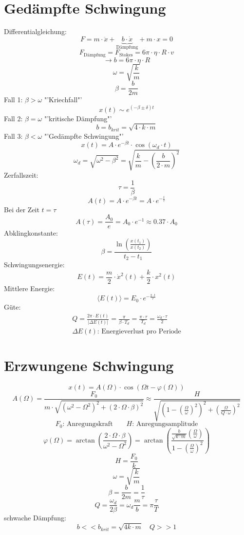 \section{Gedämpfte Schwingung}
Differentialgleichung: 
\[ \boxed{F = m \cdot \ddot{x} + \underbrace{b \cdot \dot{x}}_
{\text{Dämpfung}} + m \cdot x = 0} \]
\[ \boxed{F_{\text{Dämpfung}} = F_{\text{Stokes}} 
= 6 \pi \cdot \eta \cdot R \cdot v} \]
\[ \boxed{\rightarrow b = 6 \pi \cdot \eta \cdot R} \]
\[ \boxed{\omega = \sqrt{\frac{k}{m}}} \]
\[ \boxed{\beta = \frac{b}{2 m}} \]
Fall 1: $\beta > \omega$ "'Kriechfall"'
\[ \boxed{x(t) \sim e^{(-\beta \pm \delta)t}} \]
Fall 2: $\beta = \omega$ "'kritische Dämpfung"'
\[ \boxed{b = b_{krit} = \sqrt{4 \cdot k \cdot m}} \]
Fall 3: $\beta < \omega$ "'Gedämpfte Schwingung"'
\[ \boxed{x(t) = A \cdot e^{-\beta t} \cdot \cos(\omega_d \cdot t)} \]
\[ \boxed{\omega_d = \sqrt{\omega^2 - \beta^2} 
= \sqrt{\frac{k}{m} - \left({\frac{b}{2 \cdot m}}\right)^2}} \]
Zerfallszeit: 
\[ \boxed{\tau = \frac{1}{\beta}} \]
\[ \boxed{A(t) = A \cdot e^{-\beta t} = A \cdot e^{-\frac{t}{\tau}}} \]
Bei der Zeit $t = \tau$
\[ \boxed{A(\tau) = \frac{A_0}{e} = A_0 \cdot e^{-1} \approx 0.37 \cdot A_0} \]
Abklingkonstante: 
\[ \boxed{\beta 
= \frac{\ln\left(\frac{x(t_1)}{x(t_2)}\right)}{t_2 - t_1}} \]
Schwingungsenergie: 
\[ \boxed{E(t) = \frac{m}{2} \cdot \dot{x}^2(t) + \frac{k}{2} \cdot x^2(t)} \]
Mittlere Energie: 
\[ \boxed{\langle E(t)\rangle = E_0 \cdot e^{-\frac{2 \cdot t}{\tau}}} \]
Güte: 
\[ \begin{array}{l}
\boxed{Q = \frac{2 \pi \cdot E(t)}{|\Delta E(t)|} 
= \frac{\pi}{\beta \cdot T_d} = \frac{\pi \cdot \tau}{T_d} 
= \frac{\omega_d \cdot \tau}{2}} \\
\text{$\Delta E(t)$: Energieverlust pro Periode}
\end{array} \]

\section{Erzwungene Schwingung}
\[ \boxed{x(t) = A(\Omega) \cdot \cos(\Omega t - \varphi(\Omega))} \]
\[ \boxed{A(\Omega) = \frac{F_0}{m \cdot 
\sqrt{(\omega^2 - \Omega^2)^2 + (2 \cdot \Omega \cdot \beta)^2}} 
\approx \frac{H}{\sqrt{\left(1 - \left(\frac{\Omega}{\omega}\right)^2\right)^2 
+ \left(\frac{\Omega}{Q \cdot \omega}\right)^2}}} \]  
\[ F_0\text{: Anregungskraft} \qquad H\text{: Anregungsamplitude} \]
\[ \boxed{\varphi(\Omega) = \arctan\left(\frac{2 \cdot \Omega \cdot \beta}
{{\omega}^2 - \Omega^2}\right) 
= \arctan{\left(\frac{\frac{b}{\sqrt{k \cdot m}} 
\left(\frac{\Omega}{\omega}\right)}
{1 - \left(\frac{\Omega}{\omega}\right)^2}\right)}} \]
\[ \boxed{H = \frac{F_0}{k}} \]
\[ \boxed{\omega = \sqrt{\frac{k}{m}}} \]
\[ \boxed{\beta = \frac{b}{2 m} = \frac{1}{\tau}} \]
\[ \boxed{Q = \frac{\omega_d}{2\beta} = \omega_d \frac{m}{b} 
= \pi \frac{\tau}{T}} \]
schwache Dämpfung: 
\[ \boxed{b << b_{krit} = \sqrt{4 k \cdot m} \quad Q >> 1} \]

